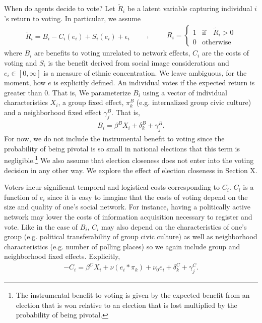 \documentclass[11pt, oneside]{article}   	%
\newcommand{\eqs}[1]{\begin{align*}#1\end{align*}}
\begin{document}
When do agents decide to vote? Let $\tilde{R}_i$ be a latent variable capturing individual $i$'s return to voting. In particular, we assume
\begin{equation}
\begin{split}
	\tilde R_i = B_i - C_i(e_i) + S_i(e_i)  +\epsilon_i 
\end{split}
\quad \quad , \quad \quad
\begin{split}
	R_i =
	\begin{cases}
		1 & \textrm{if} \quad \tilde R_i > 0 \\
		0 & \textrm{otherwise}
	\end{cases}
\end{split}
\end{equation}
where $B_i$ are benefits to voting unrelated to network effects, $C_i$ are the costs of voting and $S_i$ is the benefit derived from social image considerations and $e_i \in [0,\infty]$ is a measure of ethnic concentration. We leave ambiguous, for the moment, how $e$ is explicitly defined. An individual votes if the expected return is greater than 0. That is,
We parameterize $B_i$ using a vector of individual characteristics $X_i$, a group fixed effect, $\pi^B_k$ (e.g. internalized group civic culture) and a neighborhood fixed effect $\gamma^B_j$. That is,
\eqs{
	B_i = \beta^B X_i + \delta^B_k + \gamma^B_j.
}
For now, we do not include the instrumental benefit to voting since the probability of being pivotal is so small in national elections that this term is negligible.\footnote{The instrumental benefit to voting is given by the expected benefit from an election that is won relative to an election that is lost multiplied by the probability of being pivotal.} We also assume that election closeness does not enter into the voting decision in any other way. We explore the effect of election closeness in Section X.

Voters incur significant temporal and logistical costs corresponding to $C_i$. $C_i$ is a function of $e_i$ since it is easy to imagine that the costs of voting depend on the size and quality of one's social network. For instance, having a politically active network may lower the costs of information acquisition necessary to register and vote. Like in the case of $B_i$, $C_i$ may also depend on the characteristics of one's group (e.g. political transferability of group civic culture) as well as neighborhood characteristics (e.g. number of polling places) so we again include group and neighborhood fixed effects. Explicitly,
\eqs{
	-C_i = \beta^C X_i + \nu (e_i * \pi_k) + \nu_0 e_i + \delta^C_k + \gamma^C_j.
}
\end{document}
